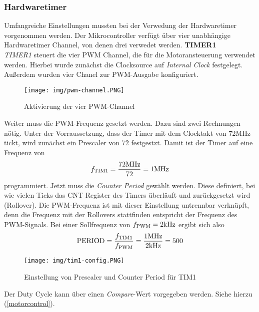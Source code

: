 \documentclass[12pt, a4paper]{report}
\begin{document}
         \subsubsection{Hardwaretimer}\label{hardwaretimer}
         Umfangreiche Einstellungen mussten bei der Verwedung der Hardwaretimer vorgenommen werden. Der Mikrocontroller verfügt über vier unabhängige Hardwaretimer Channel, von denen drei verwedet werden.
         \newpage
         \textbf{TIMER1}\label{timer1}\\
         \textit{TIMER1} steuert die vier PWM Channel, die für die Motoransteuerung verwendet werden. Hierbei wurde zunächst die Clocksource auf \textit{Internal Clock} festgelegt. Außerdem wurden vier Chanel zur PWM-Ausgabe konfiguriert.
         \begin{figure}[H]
            \centering
            \texttt{[image: img/pwm-channel.PNG]}
            \caption{Aktivierung der vier PWM-Channel}
         \end{figure}
         Weiter muss die PWM-Frequenz gesetzt werden. Dazu sind zwei Rechnungen nötig.
         Unter der Vorraussetzung, dass der Timer mit dem Clocktakt von 72MHz tickt, wird zunächst ein Prescaler von 72 festgestzt. Damit ist der Timer auf eine Frequenz von
         \begin{align}
            f_{\mathrm{TIM1}}=\dfrac{72\si[]{\mega\hertz}}{72}=1\si[]{\mega\hertz}
         \end{align}
         programmiert. Jetzt muss die \textit{Counter Period} gewählt werden. Diese definiert, bei wie vielen Ticks das CNT Register des Timers überläuft und zurückgesetzt wird (Rollover). Die PWM-Frequenz ist mit dieser Einstellung untrennbar verknüpft, denn die Frequenz mit der Rollovers stattfinden entspricht der Frequenz des PWM-Signals.
         Bei einer Sollfrequenz von $f_{\mathrm{PWM}}=2\si[]{\kilo\hertz}$ ergibt sich also 
         \begin{align}
            \mathrm{PERIOD}=\dfrac{f_{\mathrm{TIM1}}}{f_{\mathrm{PWM}}}=\dfrac{1\si[]{\mega\hertz}}{2\si[]{\kilo\hertz}}=500
         \end{align}
         \begin{figure}[H]
            \centering
            \texttt{[image: img/tim1-config.PNG]}
            \caption{Einstellung von Prescaler und Counter Period für TIM1}
         \end{figure}
         Der Duty Cycle kann über einen \textit{Compare}-Wert vorgegeben werden. Siehe hierzu (\ref{motorcontrol}).
\end{document}
